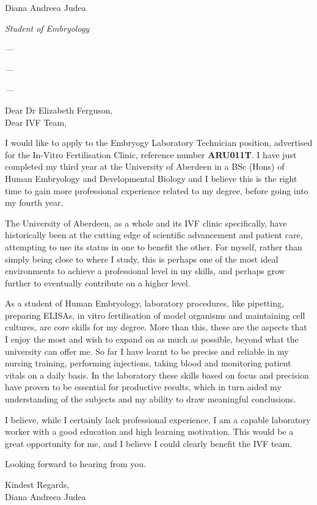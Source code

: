 \documentclass[paper=a4,fontsize=11pt]{scrartcl} %
\newcommand{\sepspace}{\vspace*{1em}}		%
\newcommand{\MyName}[1]{ %
  \Huge \usefont{OT1}{phv}{b}{n} \hfill #1
  \par \normalsize \normalfont}
\newcommand{\MySlogan}[4]{ %
  \large \usefont{OT1}{phv}{m}{n}\hfill \textit{#1} 
  \sepspace
  \par \normalsize \usefont{OT1}{phv}{m}{n}\hfill \textit{#2}
  \par \normalsize \usefont{OT1}{phv}{m}{n}\hfill \textit{#3}
  \par \normalsize \usefont{OT1}{phv}{m}{n}\hfill \textit{#4}
  \par \normalsize \normalfont}
\begin{document}
  
  \MyName{Diana Andreea Judea}
  \MySlogan{Student of Embryology}{---}{---}{---}
  \sepspace \sepspace
  
  \noindent
  Dear Dr Elizabeth Ferguson, \\
  Dear IVF Team,
  
  \sepspace
  
    \noindent
    I would like to apply to the Embryogy Laboratory Technician position, advertised for the In-Vitro Fertilisation Clinic, reference number \textbf{ARU011T}. I have just completed my third year at the University of Aberdeen in a BSc (Hons) of Human Embryology and Developmental Biology and I believe this is the right time to gain more professional experience related to my degree, before going into my fourth year.
    \sepspace
    
    
    \noindent
    The University of Aberdeen, as a whole and its IVF clinic specifically, have historically been at the cutting edge of scientific advancement and patient care, attempting to use its status in one to benefit the other. For myself, rather than simply being close to where I study, this is perhaps one of the most ideal environments to achieve a professional level in my skills, and perhaps grow further to eventually contribute on a higher level.
    \sepspace
    
    
    \noindent
    As a student of Human Embryology, laboratory procedures, like pipetting, preparing ELISAs, in vitro fertilisation of model organisms and maintaining cell cultures, are core skills for my degree. More than this, these are the aspects that I enjoy the most and wish to expand on as much as possible, beyond what the university can offer me. So far I have learnt to be precise and reliable in my nursing training, performing injections, taking blood and monitoring patient vitals on a daily basis. In the laboratory these skills based on focus and precision have proven to be essential for productive results, which in turn aided my understanding of the subjects and my ability to draw meaningful conclusions.
    \sepspace
    
    
    \noindent
    I believe, while I certainly lack professional experience, I am a capable laboratory worker with a good education and high learning motivation. This would be a great opportunity for me, and I believe I could clearly benefit the IVF team.


  \sepspace
  
  \noindent
  Looking forward to hearing from you.
  \sepspace
  
  \noindent
  Kindest Regards, \\
  Diana Andreea Judea
  
  
  
\end{document}
